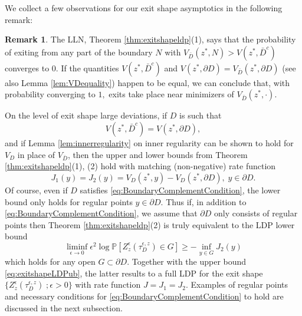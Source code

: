 \documentclass[10pt, reqno]{amsart}
\newcommand{\pr}{\mathbb{P}}
\theoremstyle{definition}
\newtheorem{rem}{Remark}
\numberwithin{lem}{section}
\numberwithin{cor}{section}
\numberwithin{prop}{section}
\numberwithin{thm}{section}
\numberwithin{dfn}{section}
\begin{document}
We collect a few observations for our exit shape asymptotics in the following remark:
\begin{rem}\label{rem:exitshapeldp} The LLN, Theorem \ref{thm:exitshapeldp}(1), says that the probability of exiting from any part of the boundary $N$ with $V_{\bar{D}}(z^*,N)>V(z^*,\bar{D}^c)$ converges to $0.$ If the quantities $V(z^*,\bar{D}^c)$ and $V(z^*,\partial D)=V_{\bar{D}}(z^*,\partial D)$ (see also Lemma \ref{lem:VDequality}) happen to be equal, we can conclude that, with probability converging to $1,$ exits take place near minimizers of $V_{\bar{D}}(z^*,\cdot).$

On the level of exit shape large deviations, if $D$ is such that
\begin{equation}\label{eq:BoundaryComplementCondition}
    V(z^*,\bar{D}^c)=V(z^*,\partial D),
\end{equation}
and if Lemma \ref{lem:innerregularity} on inner regularity can be shown to hold for $V_D$ in place of $V_{\bar{D}}$,
then the upper and lower bounds from Theorem \ref{thm:exitshapeldp}(1), (2) hold with matching (non-negative) rate function
$$J_1(y)=J_2(y)=V_D(z^*,y)-V_D(z^*,\partial D), \;y\in\partial D.$$
Of course, even if $D$ satisfies \eqref{eq:BoundaryComplementCondition}, the lower bound only holds for regular points $y\in\partial D.$ Thus if, in addition to \eqref{eq:BoundaryComplementCondition}, we assume that $\partial D$ only consists of regular points then Theorem \ref{thm:exitshapeldp}(2) is truly equivalent to the LDP lower bound
\begin{equation*}
        \liminf_{\epsilon\to 0}\epsilon^2\log\pr[ Z^\epsilon_z(\tau^{\epsilon, z}_{D})\in G ]\geq -\inf_{y\in G}J_2(y)
    \end{equation*}
 which holds for any open $G\subset\partial D.$ Together with the upper bound \eqref{eq:exitshapeLDPub}, the latter results to a full LDP for the exit shape $\{Z_z^{\epsilon}(\tau^{\epsilon,z}_D)\;;\epsilon>0 \}$ with rate function $J=J_1=J_2.$ Examples of regular points and necessary conditions for \eqref{eq:BoundaryComplementCondition} to hold are discussed in the next subsection.
\end{rem}













 
\end{document}
